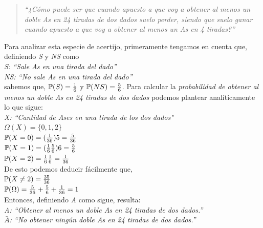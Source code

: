 \documentclass{article}
\begin{document}
\begin{quotation}
\em``¿Cómo puede ser que cuando apuesto a que voy a obtener al menos un doble As en 24 tiradas de dos dados suelo perder, siendo que suelo ganar cuando apuesto a que voy a obtener al menos un As en 4 tiradas?''
\end{quotation}

\noindent Para analizar esta especie de acertijo, primeramente tengamos en cuenta que, definiendo \textit{S} y \textit{NS} como\\

\indent \textit{S: ``Sale As en una tirada del dado''}\\
\indent \textit{NS: ``No sale As en una tirada del dado''}\\

\noindent sabemos que, $\mathbb{P}(S) = {1 \over 6}$ y $\mathbb{P}(NS) = {5 \over 6}$. 
Para calcular la \textit{probabilidad de obtener al menos un doble As en 24 tiradas de dos dados} podemos plantear analíticamente lo que sigue:\\

\indent \textit{X: ``Cantidad de Ases en una tirada de los dos dados"}\\
\indent $\Omega(X) = \{0,1,2\}$ \\

\indent $\mathbb{P}(X=0) = ({1 \over 36})5 = {5 \over 36}$ \medskip\\
\indent $\mathbb{P}(X=1) = ({1 \over 6}{5 \over 6})6 = {5 \over 6}$ \medskip\\
\indent $\mathbb{P}(X=2) = {1 \over 6}{1 \over 6} = {1 \over 36}$ \medskip\\

\noindent De esto podemos deducir fácilmente que,\\

\indent $\mathbb{P}(X \neq 2) = {35 \over 36}$ \medskip\\
\indent $\mathbb{P}(\Omega) = {5 \over 36} + {5 \over 6} + {1 \over 36} = 1$ \medskip\\

\noindent Entonces, definiendo \textit{A} como sigue, resulta:\\

\indent \textit{A: ``Obtener al menos un doble As en 24 tiradas de dos dados.''}\\
\indent \textit{$\bar{A}$: ``No obtener ningún doble As en 24 tiradas de dos dados.''}\\
\end{document}
